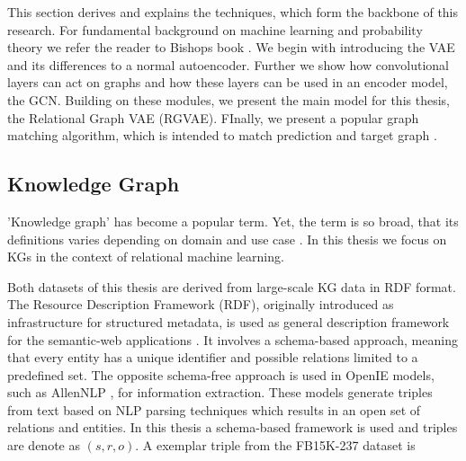 

This section derives and explains the techniques, which form the backbone of this research. For fundamental background on machine learning and probability theory we refer the reader to Bishops book \cite{bishop_pattern_2006}. We begin with introducing the VAE and its differences to a normal autoencoder. Further we show how convolutional layers can act on graphs and how these layers can be used in an encoder model, the GCN. Building on these modules, we present the main model for this thesis, the Relational Graph VAE (RGVAE). FInally, we present a popular graph matching algorithm, which is intended to match prediction and target graph \cite{paulheim_knowledge_2016}.  


\subsection{Knowledge Graph}

'Knowledge graph' has become a popular term. Yet, the term is so broad, that its definitions varies depending on domain and use case \cite{ehrlinger2016towards}. In this thesis we focus on KGs in the context of relational machine learning.

Both datasets of this thesis are derived from large-scale KG data in RDF format. The Resource Description Framework (RDF), originally introduced as infrastructure for structured metadata, is used as general description framework for the semantic-web applications \cite{miller1998introduction}. It involves a schema-based approach, meaning that every entity has a unique identifier and possible relations limited to a predefined set. The opposite schema-free approach is used in OpenIE models, such as AllenNLP \cite{gardner_allennlp_2018}, for information extraction. These models generate triples from text based on NLP parsing techniques which results in an open set of relations and entities. In this thesis a schema-based framework is used and triples are denote as $(s,r,o)$. A exemplar triple from the FB15K-237 dataset is


